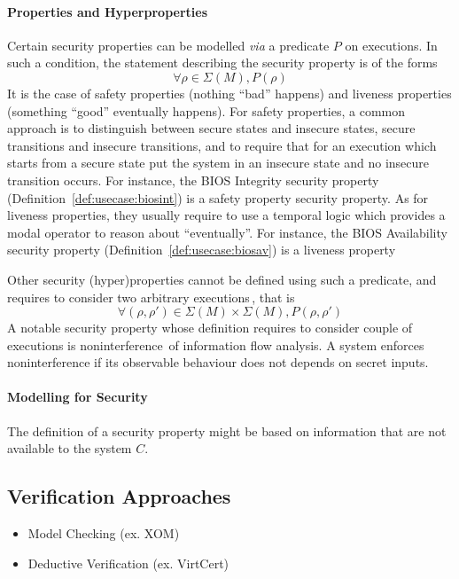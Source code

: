 \paragraph{Properties and Hyperproperties}
%
Certain security properties can be modelled \emph{via} a predicate $P$ on
executions.
%
In such a condition, the statement describing the security property is of the
forms
%
\[
  \forall \rho \in \Sigma(M), P(\rho)
\]
%
It is the case of safety properties (nothing ``bad'' happens) and liveness
properties (something ``good'' eventually happens).
%
For safety properties, a common approach is to distinguish between secure states
and insecure states, secure transitions and insecure transitions, and to require
that for an execution which starts from a secure state put the system in an
insecure state and no insecure transition occurs.
%
For instance, the BIOS Integrity security property
(Definition~\ref{def:usecase:biosint}) is a safety property security property.
%
As for liveness properties, they usually require to use a temporal logic which
provides a modal operator to reason about ``eventually''.
%
For instance, the BIOS Availability security property
(Definition~\ref{def:usecase:biosav}) is a liveness property

Other security (hyper)properties cannot be defined using such a predicate, and
requires to consider two arbitrary
executions\,\cite{clarkson2010hyperproperties}, that is
%
\[
  \forall (\rho, \rho') \in \Sigma(M) \times \Sigma(M), P(\rho, \rho')
\]
%
A notable security property whose definition requires to consider couple of
executions is noninterference\,\cite{goguen1982security} of information flow
analysis.
%
A system enforces noninterference if its observable behaviour does not depends
on secret inputs.

\paragraph{Modelling for Security}
%
The definition of a security property might be based on information that are not
available to the system $C$.

\subsection{Verification Approaches}
\label{subsec:state:approaches}

\begin{itemize}
\item Model Checking (ex. XOM)
\item Deductive Verification (ex. VirtCert)
\end{itemize}

